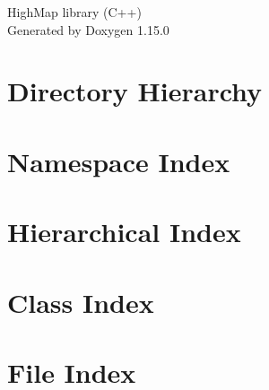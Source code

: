 \documentclass[twoside]{book}
\newcommand{\+}{\discretionary{\mbox{\scriptsize$\hookleftarrow$}}{}{}}
\newcommand{\clearemptydoublepage}{%
    \newpage{\pagestyle{empty}\cleardoublepage}%
  }
\begin{document}
  \raggedbottom
    \hypersetup{pageanchor=false,
                bookmarksnumbered=true,
                pdfencoding=unicode
               }
  \begin{titlepage}
  \vspace*{7cm}
  \begin{center}%
  {\Large High\+Map library (\+C++)}\\
  \vspace*{1cm}
  {\large Generated by Doxygen 1.15.0}\\
  \end{center}
  \end{titlepage}
  \clearemptydoublepage
  \tableofcontents
  \clearemptydoublepage
  \hypersetup{pageanchor=true}















\chapter{Directory Hierarchy}

\chapter{Namespace Index}

\chapter{Hierarchical Index}

\chapter{Class Index}

\chapter{File Index}

\end{document}
